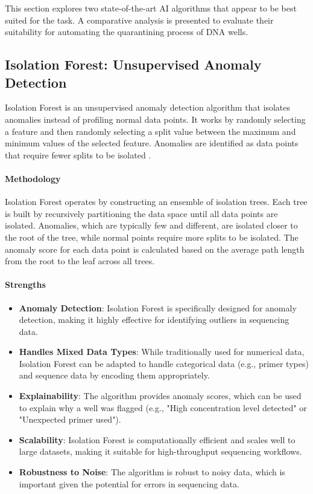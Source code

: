 This section explores two state-of-the-art AI algorithms that appear to be best suited for the task. A comparative analysis is presented to evaluate their suitability for automating the quarantining process of DNA wells.

\subsection{Isolation Forest: Unsupervised Anomaly Detection}
Isolation Forest is an unsupervised anomaly detection algorithm that isolates anomalies instead of profiling normal data points. It works by randomly selecting a feature and then randomly selecting a split value between the maximum and minimum values of the selected feature. Anomalies are identified as data points that require fewer splits to be isolated \cite{liu2008isolation}.

\paragraph{Methodology}
Isolation Forest operates by constructing an ensemble of isolation trees. Each tree is built by recursively partitioning the data space until all data points are isolated. Anomalies, which are typically few and different, are isolated closer to the root of the tree, while normal points require more splits to be isolated. The anomaly score for each data point is calculated based on the average path length from the root to the leaf across all trees.

\paragraph{Strengths}
\begin{itemize}
\item \textbf{Anomaly Detection}: Isolation Forest is specifically designed for anomaly detection, making it highly effective for identifying outliers in sequencing data.
\item \textbf{Handles Mixed Data Types}: While traditionally used for numerical data, Isolation Forest can be adapted to handle categorical data (e.g., primer types) and sequence data by encoding them appropriately.
\item \textbf{Explainability}: The algorithm provides anomaly scores, which can be used to explain why a well was flagged (e.g., "High concentration level detected" or "Unexpected primer used").
\item \textbf{Scalability}: Isolation Forest is computationally efficient and scales well to large datasets, making it suitable for high-throughput sequencing workflows.
\item \textbf{Robustness to Noise}: The algorithm is robust to noisy data, which is important given the potential for errors in sequencing data.
\end{itemize}

